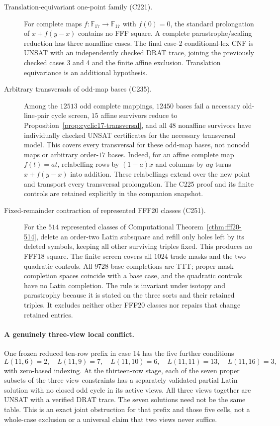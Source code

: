 \begin{description}
\item[Translation-equivariant one-point family (C221).]
For complete maps $f:\mathbb F_{17}\to\mathbb F_{17}$ with
$f(0)=0$, the standard prolongation of $x+f(y-x)$ contains no
FFF square. A complete parastrophe/scaling reduction has three
nonaffine cases. The final case-2 conditional-lex CNF is UNSAT
with an independently checked DRAT trace, joining the previously
checked cases 3 and 4 and the finite affine exclusion.
Translation equivariance is an additional hypothesis.

\item[Arbitrary transversals of odd-map bases (C235).]
Among the $12513$ odd complete mappings, $12450$ bases fail a
necessary old-line-pair cycle screen, $15$ affine survivors reduce
to Proposition~\ref{prop:cyclic17-transversal}, and all $48$ nonaffine
survivors have individually checked UNSAT certificates for the
necessary transversal model. This covers every transversal for
these odd-map bases, not nonodd maps or arbitrary order-$17$ bases.
Indeed, for an affine complete map $f(t)=at$, relabelling rows
by $(1-a)x$ and columns by $ay$ turns $x+f(y-x)$ into addition.
These relabellings extend over the new point and transport every
transversal prolongation. The C225 proof and its finite controls
are retained explicitly in the companion snapshot.

\item[Fixed-remainder contraction of represented FFF20 classes (C251).]
For the $514$ represented classes of
Computational Theorem~\ref{cthm:fff20-514}, delete an order-two
Latin subsquare and refill only holes left by its deleted symbols,
keeping all other surviving triples fixed. This produces no FFF18
square. The finite screen covers all $1024$ trade masks and the two
quadratic controls. All $9728$ base completions are TTT; proper-mask
completion spaces coincide with a base case, and the quadratic
controls have no Latin completion. The rule is invariant under
isotopy and parastrophy because it is stated on the three sorts
and their retained triples. It excludes neither other FFF20
classes nor repairs that change retained entries.
\end{description}

\paragraph{A genuinely three-view local conflict.}
One frozen reduced ten-row prefix in case 14 has the five further
conditions
\[
 L(11,6)=2,\quad L(11,9)=7,\quad L(11,10)=6,\quad
 L(11,11)=13,\quad L(11,16)=3,
\]
with zero-based indexing. At the thirteen-row stage, each of the
seven proper subsets of the three view constraints has a separately
validated partial Latin solution with no closed odd cycle in its
active views. All three views together are UNSAT with a verified
DRAT trace. The seven solutions need not be the same table. This
is an exact joint obstruction for that prefix and those five cells,
not a whole-case exclusion or a universal claim that two views
never suffice.

